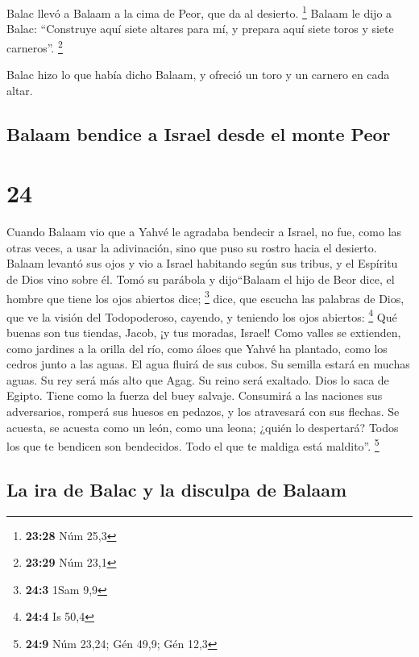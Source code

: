  Balac llevó a Balaam a la cima de Peor, que da al
desierto. \footnote{\textbf{23:28} Núm 25,3}  Balaam le
dijo a Balac: ``Construye aquí siete altares para mí, y prepara aquí
siete toros y siete carneros''. \footnote{\textbf{23:29} Núm 23,1}

 Balac hizo lo que había dicho Balaam, y ofreció un toro
y un carnero en cada altar.

\hypertarget{balaam-bendice-a-israel-desde-el-monte-peor}{%
\subsection{Balaam bendice a Israel desde el monte
Peor}\label{balaam-bendice-a-israel-desde-el-monte-peor}}

\hypertarget{section-23}{%
\section{24}\label{section-23}}

 Cuando Balaam vio que a Yahvé le agradaba bendecir a
Israel, no fue, como las otras veces, a usar la adivinación, sino que
puso su rostro hacia el desierto.  Balaam levantó sus ojos
y vio a Israel habitando según sus tribus, y el Espíritu de Dios vino
sobre él.  Tomó su parábola y dijo``Balaam el hijo de Beor
dice, el hombre que tiene los ojos abiertos dice; \footnote{\textbf{24:3}
  1Sam 9,9}  dice, que escucha las palabras de Dios, que
ve la visión del Todopoderoso, cayendo, y teniendo los ojos abiertos:
\footnote{\textbf{24:4} Is 50,4}  Qué buenas son tus
tiendas, Jacob, ¡y tus moradas, Israel!  Como valles se
extienden, como jardines a la orilla del río, como áloes que Yahvé ha
plantado, como los cedros junto a las aguas.  El agua
fluirá de sus cubos. Su semilla estará en muchas aguas. Su rey será más
alto que Agag. Su reino será exaltado.  Dios lo saca de
Egipto. Tiene como la fuerza del buey salvaje. Consumirá a las naciones
sus adversarios, romperá sus huesos en pedazos, y los atravesará con sus
flechas.  Se acuesta, se acuesta como un león, como una
leona; ¿quién lo despertará? Todos los que te bendicen son bendecidos.
Todo el que te maldiga está maldito''. \footnote{\textbf{24:9} Núm
  23,24; Gén 49,9; Gén 12,3}

\hypertarget{la-ira-de-balac-y-la-disculpa-de-balaam}{%
\subsection{La ira de Balac y la disculpa de
Balaam}\label{la-ira-de-balac-y-la-disculpa-de-balaam}}

